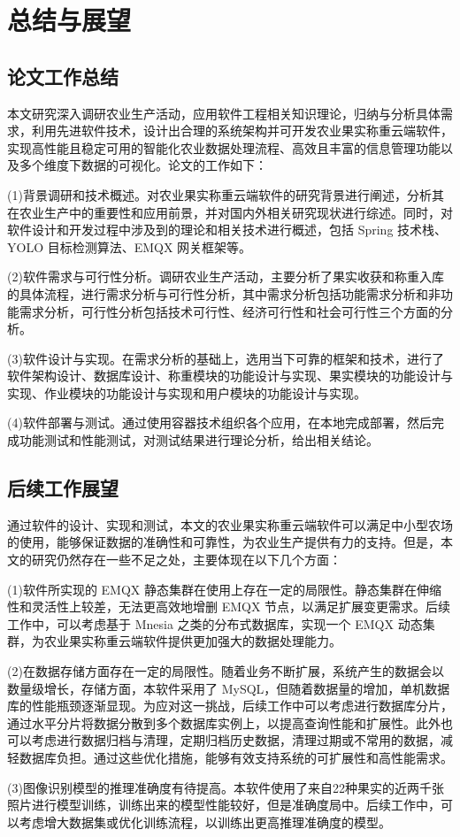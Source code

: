\chapter{总结与展望}

\section{论文工作总结}

本文研究深入调研农业生产活动，应用软件工程相关知识理论，归纳与分析具体需求，利用先进软件技术，设计出合理的系统架构并可开发农业果实称重云端软件，实现高性能且稳定可用的智能化农业数据处理流程、高效且丰富的信息管理功能以及多个维度下数据的可视化。论文的工作如下：

(1)背景调研和技术概述。对农业果实称重云端软件的研究背景进行阐述，分析其在农业生产中的重要性和应用前景，并对国内外相关研究现状进行综述。同时，对软件设计和开发过程中涉及到的理论和相关技术进行概述，包括 Spring 技术栈、YOLO 目标检测算法、EMQX 网关框架等。

(2)软件需求与可行性分析。调研农业生产活动，主要分析了果实收获和称重入库的具体流程，进行需求分析与可行性分析，其中需求分析包括功能需求分析和非功能需求分析，可行性分析包括技术可行性、经济可行性和社会可行性三个方面的分析。

(3)软件设计与实现。在需求分析的基础上，选用当下可靠的框架和技术，进行了软件架构设计、数据库设计、称重模块的功能设计与实现、果实模块的功能设计与实现、作业模块的功能设计与实现和用户模块的功能设计与实现。

(4)软件部署与测试。通过使用容器技术组织各个应用，在本地完成部署，然后完成功能测试和性能测试，对测试结果进行理论分析，给出相关结论。

\section{后续工作展望}

通过软件的设计、实现和测试，本文的农业果实称重云端软件可以满足中小型农场的使用，能够保证数据的准确性和可靠性，为农业生产提供有力的支持。但是，本文的研究仍然存在一些不足之处，主要体现在以下几个方面：

(1)软件所实现的 EMQX 静态集群在使用上存在一定的局限性。静态集群在伸缩性和灵活性上较差，无法更高效地增删 EMQX 节点，以满足扩展变更需求。后续工作中，可以考虑基于 Mnesia 之类的分布式数据库，实现一个 EMQX 动态集群，为农业果实称重云端软件提供更加强大的数据处理能力。

(2)在数据存储方面存在一定的局限性。随着业务不断扩展，系统产生的数据会以数量级增长，存储方面，本软件采用了 MySQL，但随着数据量的增加，单机数据库的性能瓶颈逐渐显现。为应对这一挑战，后续工作中可以考虑进行数据库分片，通过水平分片将数据分散到多个数据库实例上，以提高查询性能和扩展性。此外也可以考虑进行数据归档与清理，定期归档历史数据，清理过期或不常用的数据，减轻数据库负担。通过这些优化措施，能够有效支持系统的可扩展性和高性能需求。

(3)图像识别模型的推理准确度有待提高。本软件使用了来自22种果实的近两千张照片进行模型训练，训练出来的模型性能较好，但是准确度局中。后续工作中，可以考虑增大数据集或优化训练流程，以训练出更高推理准确度的模型。
